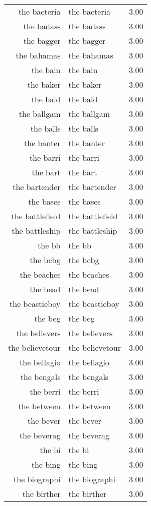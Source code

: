 \begin{table}[ht]
\begin{tabular}{rlr}
  the bacteria & the bacteria & 3.00 \\ 
  the badass & the badass & 3.00 \\ 
  the bagger & the bagger & 3.00 \\ 
  the bahamas & the bahamas & 3.00 \\ 
  the bain & the bain & 3.00 \\ 
  the baker & the baker & 3.00 \\ 
  the bald & the bald & 3.00 \\ 
  the ballgam & the ballgam & 3.00 \\ 
  the balls & the balls & 3.00 \\ 
  the banter & the banter & 3.00 \\ 
  the barri & the barri & 3.00 \\ 
  the bart & the bart & 3.00 \\ 
  the bartender & the bartender & 3.00 \\ 
  the bases & the bases & 3.00 \\ 
  the battlefield & the battlefield & 3.00 \\ 
  the battleship & the battleship & 3.00 \\ 
  the bb & the bb & 3.00 \\ 
  the bcbg & the bcbg & 3.00 \\ 
  the beaches & the beaches & 3.00 \\ 
  the bead & the bead & 3.00 \\ 
  the beastieboy & the beastieboy & 3.00 \\ 
  the beg & the beg & 3.00 \\ 
  the believers & the believers & 3.00 \\ 
  the believetour & the believetour & 3.00 \\ 
  the bellagio & the bellagio & 3.00 \\ 
  the bengals & the bengals & 3.00 \\ 
  the berri & the berri & 3.00 \\ 
  the between & the between & 3.00 \\ 
  the bever & the bever & 3.00 \\ 
  the beverag & the beverag & 3.00 \\ 
  the bi & the bi & 3.00 \\ 
  the bing & the bing & 3.00 \\ 
  the biographi & the biographi & 3.00 \\ 
  the birther & the birther & 3.00 \\ 

\end{tabular}
\end{table}
